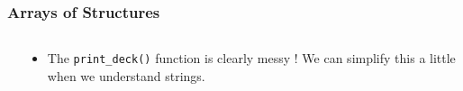 \begin{frame}[fragile]
\frametitle{Arrays of Structures}
\begin{columns}

\begin{column}{0.45\textwidth}

\end{column}

\begin{column}{0.45\textwidth}
\begin{itemize}
\item The \verb^print_deck()^ function is clearly messy ! We can simplify this a little when we understand strings.
\end{itemize}
\end{column}

\end{columns}
\end{frame}
